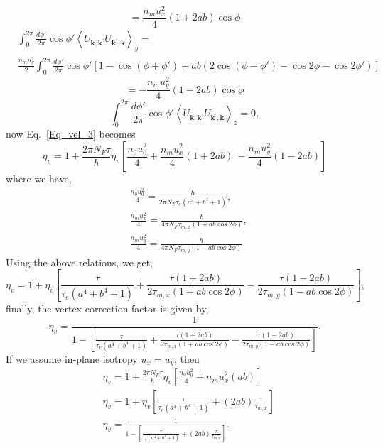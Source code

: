\documentclass[aps,prb,amsmath,amssymb,footinbib,showpacs,twocolumn]{revtex4-2}
\begin{document}
\begin{widetext}
\begin{align}
    \end{align}
    \begin{equation}
         = \frac{n_{m}u^{2}_{x}}{4}(1+2ab)\cos\phi
    \end{equation}
    \begin{align}
     &\int_{0}^{2\pi}\frac{d\phi'}{2\pi}\cos\phi'\left\langle U_{\mathbf{k}, \mathbf{k}^{\prime}} U_{\mathbf{k}^{\prime}, \mathbf{k}}\right\rangle_{y} =\nonumber\\ &\frac{n_{m}u^{2}_{y}}{2}\int_{0}^{2\pi}\frac{d\phi'}{2\pi}\cos\phi' \left[1-\cos(\phi+\phi')+ab(2\cos(\phi-\phi')-\cos2\phi-\cos2\phi')\right]
    \end{align}
    \begin{equation}
         = -\frac{n_{m}u^{2}_{y}}{4}(1-2ab)\cos\phi
    \end{equation}
    \begin{equation}
         \int_{0}^{2\pi}\frac{d\phi'}{2\pi}\cos\phi'\left\langle U_{\mathbf{k}, \mathbf{k}^{\prime}} U_{\mathbf{k}^{\prime}, \mathbf{k}}\right\rangle_{z}= 0, 
    \end{equation}
    now Eq.~\ref{Eq_vel_3}  becomes
    \begin{equation}
        \eta_{v}=1+\frac{2\pi N_{F}\tau}{\hbar}\eta_{v}\left[\frac{n_{0}u_{0}^{2}}{4}+\frac{n_{m}u^{2}_{x}}{4}(1+2ab)\ -\frac{n_{m}u^{2}_{y}}{4}(1-2ab)\right]
    \end{equation} 
    where we have,
  \begin{align}
  &\frac{n_{0}u_{0}^{2}}{4}=\frac{\hbar}{2\pi N_{F}\tau_{e}(a^{4}+b^{4}+1)},\nonumber \\
  &\frac{n_{m}u^{2}_{x}}{4}=  \frac{\hbar}{4\pi N_{F}\tau_{m,x}(1+ab\cos2\phi)},\nonumber \\
  &\frac{n_{m}u^{2}_{y}}{4}= \frac{\hbar}{4\pi N_{F}\tau_{m,y}(1-ab\cos2\phi)}.
\end{align}  
Using the above relations, we get,
\begin{equation}
    \eta_{v}=1+\eta_{v}\left[\frac{\tau}{\tau_{e}(a^{4}+b^{4}+1)}+\frac{\tau(1+2ab)}{2\tau_{m,x}(1+ab\cos2\phi)}-\frac{\tau(1-2ab)}{2\tau_{m,y}(1-ab\cos2\phi)}\right],
\end{equation}
finally, the vertex correction factor is given by,
\begin{equation}
    \eta_{v}=\frac{1}{1-\left[\frac{\tau}{\tau_{e}(a^{4}+b^{4}+1)}+\frac{\tau(1+2ab)}{2\tau_{m,x}(1+ab\cos2\phi)}-\frac{\tau(1-2ab)}{2\tau_{m,y}(1-ab\cos2\phi)}\right]}.
\end{equation}
If we assume in-plane isotropy $u_{x}= u_{y}$, then 
\begin{align}
    &\eta_{v}=1+\frac{2\pi N_{F}\tau}{\hbar}\eta_{v}\left[\frac{n_{0}u_{0}^{2}}{4}+n_{m}u^{2}_{x}(ab)\right] \nonumber\\&
   \eta_{v}=1+\eta_{v}\left[\frac{\tau}{\tau_{e}(a^{4}+b^{4}+1)}+(2ab)\frac{\tau}{\tau_{m,x}}\right]\nonumber\\&
    \eta_{v}=\frac{1}{1-\left[\frac{\tau}{\tau_{e}(a^{4}+b^{4}+1)}+(2ab)\frac{\tau}{\tau_{m,x}}\right]}.  
   \end{align}

\end{widetext}
\end{document}
